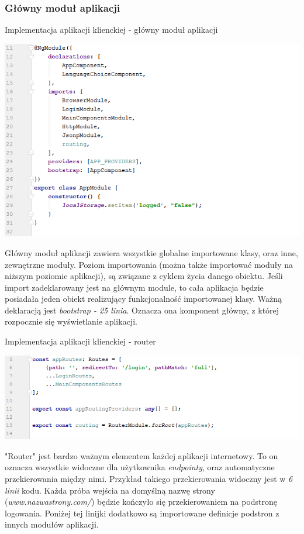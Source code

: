 \documentclass[10pt,titlepage]{article} %
\begin{document}
\subsubsection{Główny moduł aplikacji}\label{Glowny modul aplikacji}
\begin{listing}[H]
\caption[Implementacja aplikacji klienckiej - główny moduł aplikacji]{Implementacja aplikacji klienckiej - główny moduł aplikacji}
\includegraphics[width=\textwidth]{img/sekcja3/frontend/glownyModulAplikacji}
\end{listing}
Główny moduł aplikacji zawiera wszystkie globalne importowane klasy, oraz inne, zewnętrzne moduły. Poziom importowania (można także importować moduły na niższym poziomie aplikacji), są związane z cyklem życia danego obiektu. Jeśli import zadeklarowany jest na głównym module, to cała aplikacja będzie posiadała jeden obiekt realizujący funkcjonalność importowanej klasy. Ważną deklaracją jest \textit{bootstrap - 25 linia}. Oznacza ona komponent główny, z której rozpocznie się wyświetlanie aplikacji.

\begin{listing}[H]
\caption[Implementacja aplikacji klienckiej - router]{Implementacja aplikacji klienckiej - router}
\includegraphics[width=\textwidth]{img/sekcja3/frontend/glowneRoutowanie}
\end{listing}
"Router" jest bardzo ważnym elementem każdej aplikacji internetowy. To on oznacza wszystkie widoczne dla użytkownika \textit{endpointy}, oraz automatyczne przekierowania między nimi. Przykład takiego przekierowania widoczny jest w \textit{6 linii} kodu. Każda próba wejścia na domyślną nazwę strony (\textit{www.nazwastrony.com/}) będzie kończyło się przekierowaniem na podstronę logowania. Poniżej tej linijki dodatkowo są importowane definicje podstron z innych modułów aplikacji.
\end{document}
